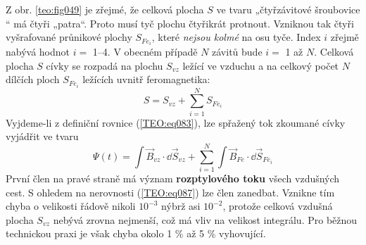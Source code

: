       Z obr.  \ref{teo:fig049} je zřejmé, že celková plocha \(S\) ve tvaru „čtyřzávitové šroubovice
      “ má čtyři „patra“. Proto musí tyč plochu čtyřikrát protnout. Vzniknou tak čtyři vyšrafované
      průnikové plochy \(S_{Fe_i}\), které \emph{nejsou kolmé} na osu tyče. Index \(i\) zřejmě
      nabývá hodnot \(i =\) \numrange{1}{4}. V obecném případě \(N\) závitů bude \(i =\) \num{1} až
      \(N\). Celková plocha \(S\) cívky se rozpadá na plochu \(S_{vz}\) ležící ve vzduchu a na
      celkový počet \(N\) dílčích ploch \(S_{Fe_i}\) ležících uvnitř feromagnetika:
      \begin{equation}\label{TEO:eq088}
        S = S_{vz} + \sum\limits_{i=1}^{N}S_{Fe_i} 
      \end{equation}
      Vyjdeme-li z definiční rovnice (\ref{TEO:eq083}), lze spřažený tok zkoumané cívky 
      vyjádřit ve tvaru
      \begin{equation}\label{TEO:eq110}
         \Psi(t) = \int \vec{B}_{vz}\cdot \dd{\vec{S}}_{vz} + 
                   \sum_{i=1}^{N}\int\vec{B}_{Fe}\cdot \dd{\vec{S}}_{Fe_i}
      \end{equation}
      První člen na pravé straně má význam \textbf{rozptylového toku} všech vzdušných cest. S 
      ohledem na nerovnosti (\ref{TEO:eq087}) lze člen zanedbat. Vznikne tím chyba o 
      velikosti řádově nikoli \(10^{-3}\) nýbrž asi \(10^{-2}\), protože celková vzdušná plocha 
      \(S_{vz}\) nebývá zrovna nejmenší, což má vliv na velikost integrálu. Pro běžnou technickou 
      praxi je však chyba okolo 1 \% až 5 \% vyhovující.
      
